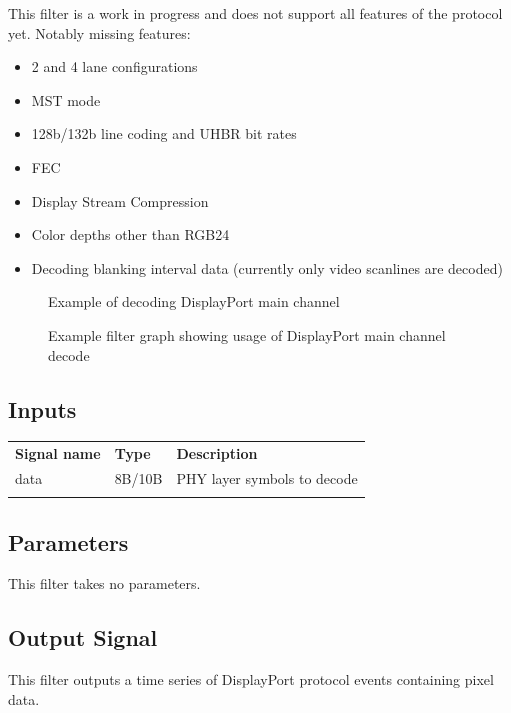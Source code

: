 This filter is a work in progress and does not support all features of the protocol yet. Notably missing features:

\begin{itemize}
\item 2 and 4 lane configurations
\item MST mode
\item 128b/132b line coding and UHBR bit rates
\item FEC
\item Display Stream Compression
\item Color depths other than RGB24
\item Decoding blanking interval data (currently only video scanlines are decoded)
\end{itemize}

\begin{figure}[h]
\centering
{}
\caption{Example of decoding DisplayPort main channel}
\label{filter_dpmain}
\end{figure}

\begin{figure}[h]
\centering
{}
\caption{Example filter graph showing usage of DisplayPort main channel decode}
\label{filter_dpmain_graph}
\end{figure}

\subsection{Inputs}

\begin{tabularx}{16cm}{llX}
\thickhline
\textbf{Signal name} & \textbf{Type} & \textbf{Description} \\
\thickhline
data & 8B/10B & PHY layer symbols to decode\\
\thickhline
\end{tabularx}

\subsection{Parameters}

This filter takes no parameters.

\subsection{Output Signal}

This filter outputs a time series of DisplayPort protocol events containing pixel data.


